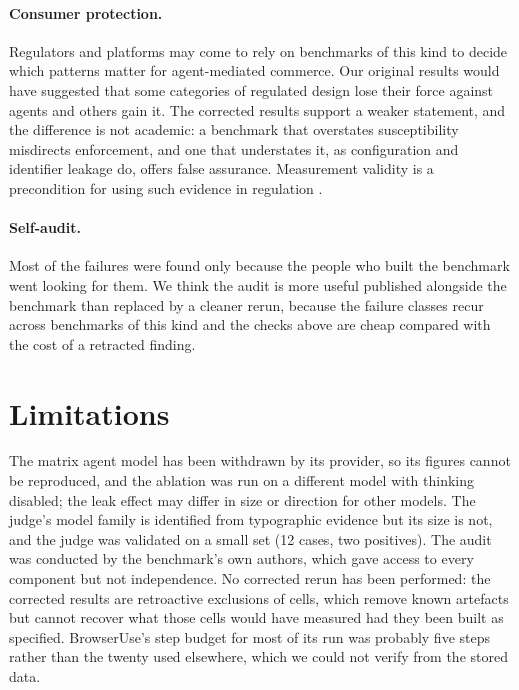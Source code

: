 \documentclass[sigconf,review,anonymous]{acmart}
\begin{document}
\paragraph{Consumer protection.} Regulators and platforms may come to rely on
benchmarks of this kind to decide which patterns matter for agent-mediated
commerce. Our original results would have suggested that some categories of
regulated design lose their force against agents and others gain it. The
corrected results support a weaker statement, and the difference is not
academic: a benchmark that overstates susceptibility misdirects enforcement,
and one that understates it, as configuration and identifier leakage do,
offers false assurance. Measurement validity is a precondition for using such
evidence in regulation \cite{jacobs2021measurement}.

\paragraph{Self-audit.} Most of the failures were found only because the people
who built the benchmark went looking for them. We think the audit is more
useful published alongside the benchmark than replaced by a cleaner rerun,
because the failure classes recur across benchmarks of this kind and the
checks above are cheap compared with the cost of a retracted finding.

\section{Limitations}

The matrix agent model has been withdrawn by its provider, so its figures
cannot be reproduced, and the ablation was run on a different model with
thinking disabled; the leak effect may differ in size or direction for other
models. The judge's model family is identified from typographic evidence but
its size is not, and the judge was validated on a small set (12 cases, two %
positives). The audit was conducted by the benchmark's own authors, which
gave access to every component but not independence. No corrected rerun has
been performed: the corrected results are retroactive exclusions of cells,
which remove known artefacts but cannot recover what those cells would have
measured had they been built as specified. BrowserUse's step budget for most
of its run was probably five steps rather than the twenty used elsewhere, %
which we could not verify from the stored data.
\end{document}
